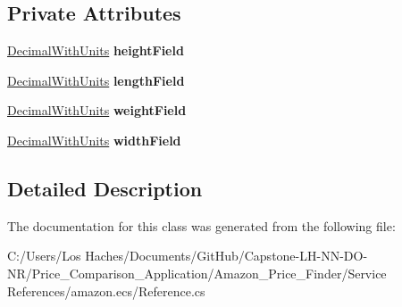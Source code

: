 \subsection*{Private Attributes}
\begin{DoxyCompactItemize}
\item 
\hypertarget{class_price___comparison_1_1amazon_1_1ecs_1_1_item_attributes_package_dimensions_aaa4c826f12ad73f0e4dd51482a919152}{\hyperlink{class_price___comparison_1_1amazon_1_1ecs_1_1_decimal_with_units}{Decimal\-With\-Units} {\bfseries height\-Field}}\label{class_price___comparison_1_1amazon_1_1ecs_1_1_item_attributes_package_dimensions_aaa4c826f12ad73f0e4dd51482a919152}

\item 
\hypertarget{class_price___comparison_1_1amazon_1_1ecs_1_1_item_attributes_package_dimensions_a85bf9af2b4d431ab9139c33f1664a537}{\hyperlink{class_price___comparison_1_1amazon_1_1ecs_1_1_decimal_with_units}{Decimal\-With\-Units} {\bfseries length\-Field}}\label{class_price___comparison_1_1amazon_1_1ecs_1_1_item_attributes_package_dimensions_a85bf9af2b4d431ab9139c33f1664a537}

\item 
\hypertarget{class_price___comparison_1_1amazon_1_1ecs_1_1_item_attributes_package_dimensions_ad650510be956ce064abe0c7a4d86d70a}{\hyperlink{class_price___comparison_1_1amazon_1_1ecs_1_1_decimal_with_units}{Decimal\-With\-Units} {\bfseries weight\-Field}}\label{class_price___comparison_1_1amazon_1_1ecs_1_1_item_attributes_package_dimensions_ad650510be956ce064abe0c7a4d86d70a}

\item 
\hypertarget{class_price___comparison_1_1amazon_1_1ecs_1_1_item_attributes_package_dimensions_a61d5aa1ec53471d110c3741a3bce9ff5}{\hyperlink{class_price___comparison_1_1amazon_1_1ecs_1_1_decimal_with_units}{Decimal\-With\-Units} {\bfseries width\-Field}}\label{class_price___comparison_1_1amazon_1_1ecs_1_1_item_attributes_package_dimensions_a61d5aa1ec53471d110c3741a3bce9ff5}

\end{DoxyCompactItemize}


\subsection{Detailed Description}


The documentation for this class was generated from the following file\-:\begin{DoxyCompactItemize}
\item 
C\-:/\-Users/\-Los Haches/\-Documents/\-Git\-Hub/\-Capstone-\/\-L\-H-\/\-N\-N-\/\-D\-O-\/\-N\-R/\-Price\-\_\-\-Comparison\-\_\-\-Application/\-Amazon\-\_\-\-Price\-\_\-\-Finder/\-Service References/amazon.\-ecs/Reference.\-cs\end{DoxyCompactItemize}

